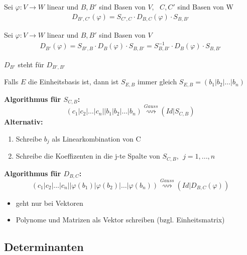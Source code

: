 \documentclass{scrartcl}
\begin{document}
\begin{Def}
  Sei $\varphi : V \rightarrow W $ linear und $B,B'$ sind Basen von $V,~~~ C, C'$ sind Basen von W
  \begin{align*}
  D_{B',C'}(\varphi) = S_{C', C} \cdot D_{B,C} (\varphi) \cdot S_{B,B'}
  \end{align*}
\end{Def}

\begin{Def}
  Sei $\varphi : V \rightarrow W $ linear und $B,B'$ sind Basen von $V$
  \begin{align*}
  D_{B'}(\varphi) = S_{B',B} \cdot D_B(\varphi) \cdot S_{B,B'} = S_{B,B'}^{-1} \cdot D_B(\varphi) \cdot S_{B,B'}
  \end{align*}
  \begin{Notiz}
  $D_{B'}$ steht für $D_{B', B'}$
  \end{Notiz}
\end{Def}

\begin{Def}
  Falls $E$ die Einheitsbasis ist, dann ist $S_{E,B}$ immer gleich $S_{E,B} = (b_1|b_2|\dots | b_n)$
\end{Def}

\textbf{Algorithmus für $S_{C,B}$:}
\[(c_1 | c_2| \dots | c_n || b_1 | b_2 | \dots | b_n) \overset{Gauss}{\rightsquigarrow} (Id | S_{C,B})\]
\textbf{Alternativ:}
\begin{enumerate}
\item Schreibe $b_j$ als Linearkombination von C
\item Schreibe die Koeffizenten in die j-te Spalte von $S_{C,B}, ~~j=1,..., n$
\end{enumerate}

\textbf{Algorithmus für $D_{B,C}$:}
\[(c_1 | c_2| \dots | c_n || \varphi(b_1) | \varphi(b_2) | \dots | \varphi(b_n)) \overset{Gauss}{\rightsquigarrow} (Id | D_{B,C}(\varphi))\]


\begin{Notiz}
\begin{itemize}
\item geht nur bei Vektoren
\item Polynome und Matrizen als Vektor schreiben (bzgl. Einheitsmatrix)
\end{itemize}
\end{Notiz}



\subsection{Determinanten}
\end{document}
